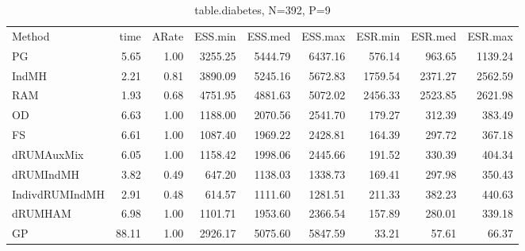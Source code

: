\begin{table}
\label{tab:blogit-diabetes}
\begin{tabular}{l r r r r r r r r } 
          Method  &     time &    ARate &  ESS.min &  ESS.med &  ESS.max &  ESR.min &  ESR.med &  ESR.max \\ 
              PG  &     5.65 &     1.00 &  3255.25 &  5444.79 &  6437.16 &   576.14 &   963.65 &  1139.24 \\ 
           IndMH  &     2.21 &     0.81 &  3890.09 &  5245.16 &  5672.83 &  1759.54 &  2371.27 &  2562.59 \\ 
             RAM  &     1.93 &     0.68 &  4751.95 &  4881.63 &  5072.02 &  2456.33 &  2523.85 &  2621.98 \\ 
              OD  &     6.63 &     1.00 &  1188.00 &  2070.56 &  2541.70 &   179.27 &   312.39 &   383.49 \\ 
              FS  &     6.61 &     1.00 &  1087.40 &  1969.22 &  2428.81 &   164.39 &   297.72 &   367.18 \\ 
      dRUMAuxMix  &     6.05 &     1.00 &  1158.42 &  1998.06 &  2445.66 &   191.52 &   330.39 &   404.34 \\ 
       dRUMIndMH  &     3.82 &     0.49 &   647.20 &  1138.03 &  1338.73 &   169.41 &   297.98 &   350.43 \\ 
  IndivdRUMIndMH  &     2.91 &     0.48 &   614.57 &  1111.60 &  1281.51 &   211.33 &   382.23 &   440.63 \\ 
         dRUMHAM  &     6.98 &     1.00 &  1101.71 &  1953.60 &  2366.54 &   157.89 &   280.01 &   339.18 \\ 
              GP  &    88.11 &     1.00 &  2926.17 &  5075.60 &  5847.59 &    33.21 &    57.61 &    66.37
 \end{tabular}
\caption{table.diabetes, N=392, P=9}
\end{table}

